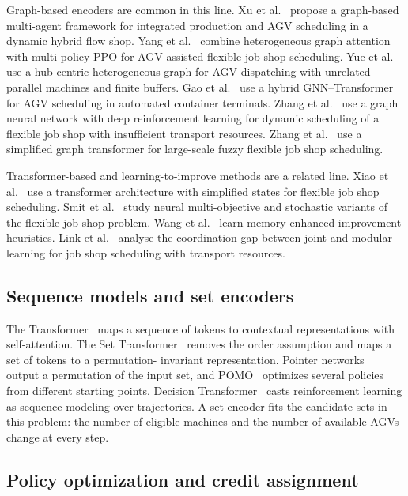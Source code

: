 Graph-based encoders are common in this line. Xu et
al.~\cite{taagnet2026} propose a graph-based multi-agent framework for
integrated production and AGV scheduling in a dynamic hybrid flow shop. Yang
et al.~\cite{yang2026hgamppo} combine heterogeneous graph attention with
multi-policy PPO for AGV-assisted flexible job shop scheduling. Yue et
al.~\cite{yue2027hchgnn} use a hub-centric heterogeneous graph for AGV
dispatching with unrelated parallel machines and finite buffers. Gao et
al.~\cite{gao2026gnntransformer} use a hybrid GNN--Transformer for AGV
scheduling in automated container terminals. Zhang et
al.~\cite{zhang2023dynamic} use a graph neural network with deep
reinforcement learning for dynamic scheduling of a flexible job shop with
insufficient transport resources. Zhang et
al.~\cite{zhang2025sgformer} use a simplified graph transformer for
large-scale fuzzy flexible job shop scheduling.

Transformer-based and learning-to-improve methods are a related line. Xiao
et al.~\cite{xiao2026resched} use a transformer architecture with simplified
states for flexible job shop scheduling. Smit et
al.~\cite{smit2026dcan,smit2025stochastic} study neural multi-objective and
stochastic variants of the flexible job shop problem. Wang et
al.~\cite{wang2025memory} learn memory-enhanced improvement heuristics. Link
et al.~\cite{link2026coordination} analyse the coordination gap between
joint and modular learning for job shop scheduling with transport resources.

\subsection{Sequence models and set encoders}

The Transformer~\cite{vaswani2017} maps a sequence of tokens to contextual
representations with self-attention. The Set Transformer~\cite{lee2019set}
removes the order assumption and maps a set of tokens to a permutation-
invariant representation. Pointer networks~\cite{vinyals2015pointer} output
a permutation of the input set, and POMO~\cite{kwon2020pomo} optimizes
several policies from different starting points. Decision
Transformer~\cite{chen2021decision} casts reinforcement learning as sequence
modeling over trajectories. A set encoder fits the candidate sets in this
problem: the number of eligible machines and the number of available AGVs
change at every step.

\subsection{Policy optimization and credit assignment}


